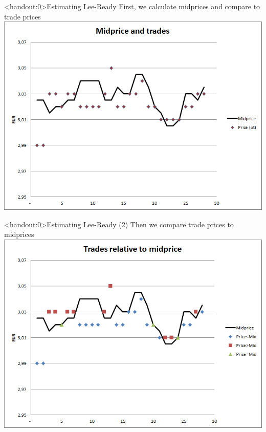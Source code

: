 \documentclass[english,10pt
,aspectratio=169
]{beamer}
\begin{document}
\begin{frame}<handout:0>{Estimating Lee-Ready}
	First, we calculate midprices and compare to trade prices
	\center
	\includegraphics[scale=0.39]{pics/L2_midandtrade}
\end{frame}


\begin{frame}<handout:0>{Estimating Lee-Ready (2)}
	Then we compare trade prices to midprices
	\center
	\includegraphics[scale=0.39]{pics/L2_traderelativemid}
\end{frame}
\end{document}
